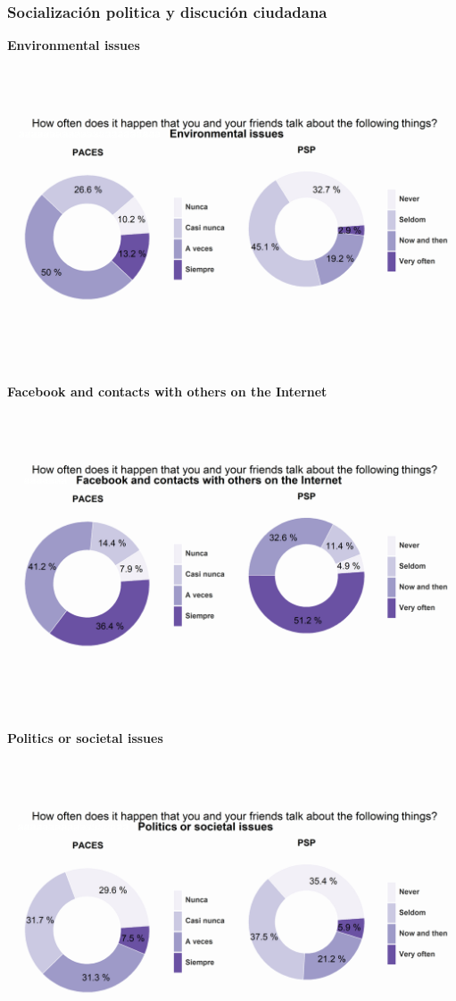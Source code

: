 \documentclass[12pt,twoside]{templates/facsothesis}
\begin{document}
\hypertarget{socializaciuxf3n-politica-y-discuciuxf3n-ciudadana}{%
\subsubsection{Socialización politica y discución ciudadana}\label{socializaciuxf3n-politica-y-discuciuxf3n-ciudadana}}

\textbf{Environmental issues}

\includegraphics{output/plotdiscper1.png}

\textbf{Facebook and contacts with others on the Internet}

\includegraphics{output/plotdiscper2.png}

\textbf{Politics or societal issues}

\includegraphics{output/plotdiscper3.png}
\end{document}
